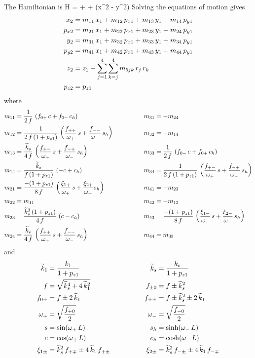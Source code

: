 The Hamiltonian is
\Begineq
  H =  + 
   +  (x^2 - y^2)
\Endeq
Solving the equations of motion gives
\begin{align}
  x_2    &= m_{11} \, x_1 + m_{12} \, p_{x1} + m_{13} \, y_1 + m_{14} \, p_{y1} \nonumber \\
  p_{x2} &= m_{21} \, x_1 + m_{22} \, p_{x1} + m_{23} \, y_1 + m_{24} \, p_{y1} \nonumber \\
  y_2    &= m_{31} \, x_1 + m_{32} \, p_{x1} + m_{33} \, y_1 + m_{34} \, p_{y1} \nonumber \\
  p_{y2} &= m_{41} \, x_1 + m_{42} \, p_{x1} + m_{43} \, y_1 + m_{44} \, p_{y1} \\
  z_2    &= z_1 + \sum_{j = 1}^4 \sum_{k = j}^4 m_{5jk} \, r_j \, r_k  \nonumber \\
  p_{z2} &= p_{z1} \nonumber
\end{align}
where
\begin{alignat}{2}
  m_{11} &= \frac{1}{2 \, f} \, \left( f_{0+} \, c + f_{0-} \, c_h \right) & \qquad \qquad
  m_{31} &= -m_{24} \nonumber \\
  m_{12} &= \frac{1}{2 \, f \, (1 + p_{z1})} \, 
            \left( \frac{f_{++}}{\omega_+} \,  s + \frac{f_{--}}{\omega_-} \, s_h \right) & \qquad \qquad
  m_{32} &= -m_{14} \nonumber \\
  m_{13} &= \frac{\widetilde k_s}{4 \, f} \, 
            \left( \frac{f_{+-}}{\omega_+} \, s +\frac{f_{-+}}{\omega_-} \, s_h \right) & \qquad \qquad
  m_{33} &= \frac{1}{2 \, f} \, \left( f_{0-} \, c + f_{0+} \, c_h \right) \nonumber \\
  m_{14} &= \frac{\widetilde k_s}{f \, (1 + p_{z1})} \, \left( -c + c_h \right) & \qquad \qquad
  m_{34} &= \frac{1}{2 \, f \, (1 + p_{z1})} \, 
            \left( \frac{f_{+-}}{\omega_+} \, s + \frac{f_{-+}}{\omega_-} \, s_h \right) \nonumber \\
  m_{21} &= \frac{-(1 + p_{z1})}{8 \, f} \, 
            \left( \frac{\xi_{1+}}{\omega_+} \, s + \frac{\xi_{2+}}{\omega_-} s_h \right) & \qquad \qquad
  m_{41} &= -m_{23} \\
  m_{22} &= m_{11} & \qquad \qquad
  m_{42} &= -m_{13} \nonumber \\
  m_{23} &= \frac{\widetilde k_s^3 \, (1 + p_{z1})}{4 \, f} \, \left( c - c_h \right) & \qquad \qquad
  m_{43} &= \frac{-(1 + p_{z1})}{8 \, f} \, 
            \left( \frac{\xi_{1-}}{\omega_+} \, s + \frac{\xi_{2-}}{\omega_-} \, s_h \right) \nonumber \\
  m_{24} &= \frac{\widetilde k_s}{4 \, f} \, 
            \left( \frac{f_{++}}{\omega_+} \, s + \frac{f_{--}}{\omega_-} \, s_h \right) & \qquad \qquad
  m_{44} &= m_{33} \nonumber
\end{alignat}
and
\begin{alignat}{2}
  \widetilde k_1        &= \frac{k_1}{1 + p_{z1}} & \qquad \qquad 
  \widetilde k_s          &= \frac{k_s}{1 + p_{z1}} \nonumber \\
  f            &= \sqrt{\widetilde k_s^4 + 4 \, \widetilde k_1^2} & \qquad \qquad
  f_{\pm0}     &= f \pm \widetilde k_s^2 \nonumber \\
  f_{0\pm}     &= f \pm 2 \, \widetilde k_1 & \qquad \qquad
  f_{\pm\pm}   &= f \pm \widetilde k_s^2 \pm 2 \, \widetilde k_1 \nonumber \\
  \omega_+        &= \sqrt{\frac{f_{+0}}{2}} & \qquad \qquad
  \omega_-        &= \sqrt{\frac{f_{-0}}{2}} \\
  s            &= \sin (\omega_+ \, L) & \qquad \qquad
  s_h          &= \sinh (\omega_- \, L) \nonumber \\
  c            &= \cos (\omega_+ \, L) & \qquad \qquad
  c_h          &= \cosh (\omega_- \, L) \nonumber \\
  \xi_{1\pm} &= \widetilde k_s^2 \, f_{+\mp} \pm 4 \, \widetilde k_1 \, f_{+\pm} & \qquad \qquad
  \xi_{2\pm} &= \widetilde k_s^2 \, f_{-\pm} \pm 4 \, \widetilde k_1 \, f_{-\mp} \nonumber
\end{alignat}

